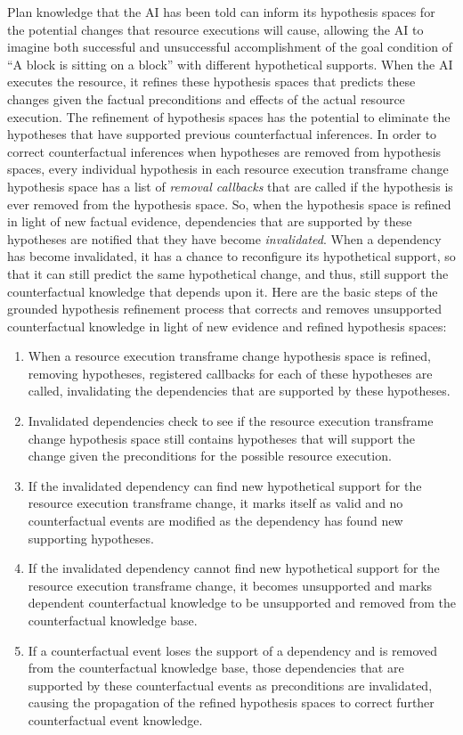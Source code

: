 Plan knowledge that the AI has been told can inform its hypothesis
spaces for the potential changes that resource executions will cause,
allowing the AI to imagine both successful and unsuccessful
accomplishment of the goal condition of ``A block is sitting on a
block'' with different hypothetical supports.  When the AI executes
the resource, it refines these hypothesis spaces that predicts these
changes given the factual preconditions and effects of the actual
resource execution.  The refinement of hypothesis spaces has the
potential to eliminate the hypotheses that have supported previous
counterfactual inferences.  In order to correct counterfactual
inferences when hypotheses are removed from hypothesis spaces, every
individual hypothesis in each resource execution transframe change
hypothesis space has a list of \emph{removal callbacks} that are
called if the hypothesis is ever removed from the hypothesis space.
So, when the hypothesis space is refined in light of new factual
evidence, dependencies that are supported by these hypotheses are
notified that they have become \emph{invalidated}.  When a dependency
has become invalidated, it has a chance to reconfigure its
hypothetical support, so that it can still predict the same
hypothetical change, and thus, still support the counterfactual
knowledge that depends upon it.  Here are the basic steps of the
grounded hypothesis refinement process that corrects and removes
unsupported counterfactual knowledge in light of new evidence and
refined hypothesis spaces:
\begin{enumerate}
\item When a resource execution transframe change hypothesis space is
  refined, removing hypotheses, registered callbacks for each of these
  hypotheses are called, invalidating the dependencies that are
  supported by these hypotheses.
\item Invalidated dependencies check to see if the resource execution
  transframe change hypothesis space still contains hypotheses that
  will support the change given the preconditions for the possible
  resource execution.
\item If the invalidated dependency can find new hypothetical support
  for the resource execution transframe change, it marks itself as
  valid and no counterfactual events are modified as the dependency
  has found new supporting hypotheses.
\item If the invalidated dependency cannot find new hypothetical
  support for the resource execution transframe change, it becomes
  unsupported and marks dependent counterfactual knowledge to be
  unsupported and removed from the counterfactual knowledge base.
\item If a counterfactual event loses the support of a dependency and
  is removed from the counterfactual knowledge base, those
  dependencies that are supported by these counterfactual events as
  preconditions are invalidated, causing the propagation of the
  refined hypothesis spaces to correct further counterfactual event knowledge.
\end{enumerate}

